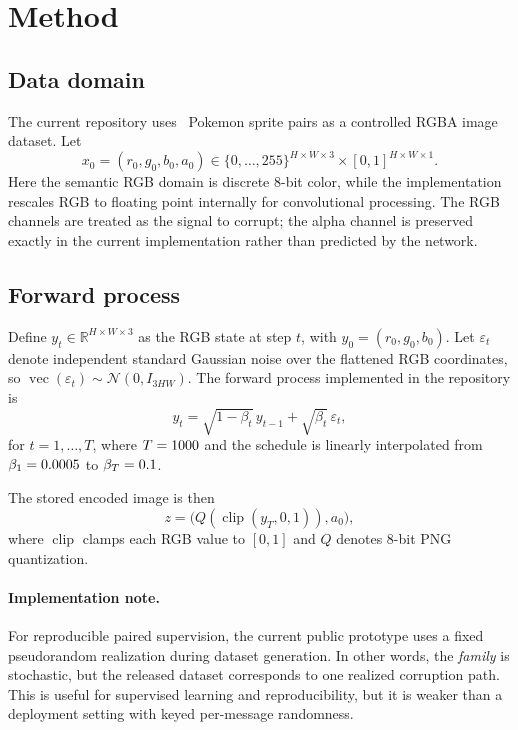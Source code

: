 \documentclass[11pt]{article}
\begin{document}
\section{Method}
\subsection{Data domain}
The current repository uses \NumPairs\ Pokemon sprite pairs as a controlled RGBA image dataset. Let
\begin{equation}
x_0 = (r_0, g_0, b_0, a_0) \in \{0,\dots,255\}^{H \times W \times 3} \times [0,1]^{H \times W \times 1}.
\end{equation}
Here the semantic RGB domain is discrete $8$-bit color, while the implementation rescales RGB to floating point internally for convolutional processing. The RGB channels are treated as the signal to corrupt; the alpha channel is preserved exactly in the current implementation rather than predicted by the network.

\subsection{Forward process}
Define $y_t \in \mathbb{R}^{H \times W \times 3}$ as the RGB state at step $t$, with $y_0 = (r_0,g_0,b_0)$. Let $\varepsilon_t$ denote independent standard Gaussian noise over the flattened RGB coordinates, so $\operatorname{vec}(\varepsilon_t) \sim \mathcal{N}(0, I_{3HW})$. The forward process implemented in the repository is
\begin{equation}
y_t = \sqrt{1-\beta_t}\, y_{t-1} + \sqrt{\beta_t}\, \varepsilon_t,
\label{eq:forward}
\end{equation}
for $t=1,\dots,T$, where $T=1000$ and the schedule is linearly interpolated from $\beta_1=0.0005$ to $\beta_T=0.1$.

The stored encoded image is then
\begin{equation}
z = \bigl(Q(\operatorname{clip}(y_T, 0, 1)), a_0\bigr),
\label{eq:stored}
\end{equation}
where $\operatorname{clip}$ clamps each RGB value to $[0,1]$ and $Q$ denotes 8-bit PNG quantization.

\paragraph{Implementation note.}
For reproducible paired supervision, the current public prototype uses a fixed pseudorandom realization during dataset generation. In other words, the \emph{family} is stochastic, but the released dataset corresponds to one realized corruption path. This is useful for supervised learning and reproducibility, but it is weaker than a deployment setting with keyed per-message randomness.
\end{document}
